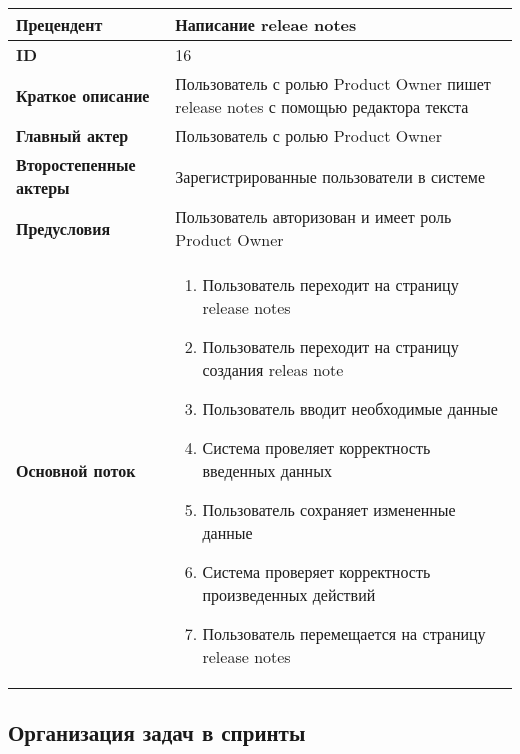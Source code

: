 \documentclass[14pt,a4paper]{extarticle}
\begin{document}
\begin{tabular}{|l|p{9cm}|}
	\hline
	\textbf{Прецендент}            & Написание releae notes                                                       \\
	\hline
	\textbf{ID}                    & 16                                                                           \\
	\hline
	\textbf{Краткое описание}      & Пользователь с ролью Product Owner пишет release notes с помощью редактора текста \\
	\hline
	\textbf{Главный актер}         & Пользователь с ролью Product Owner                                            \\
	\hline
	\textbf{Второстепенные актеры} & Зарегистрированные пользователи в системе                                     \\
	\hline
	\textbf{Предусловия}           & Пользователь авторизован и имеет роль Product Owner                           \\
	\hline
	\textbf{Основной поток}        & \begin{enumerate}
		                                 \item Пользователь переходит на страницу release notes
		                                 \item Пользователь переходит на страницу создания releas note
					         \item Пользователь вводит необходимые данные
						 \item Система провеляет корректность введенных данных
					         \item Пользователь сохраняет измененные данные
		                                 \item Система проверяет корректность произведенных действий
						 \item Пользователь перемещается на страницу release notes
	                                 \end{enumerate} \\
	\hline
\end{tabular}

\subsection{Организация задач в спринты}
\end{document}
